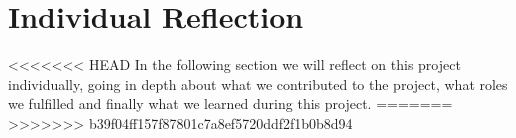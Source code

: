 \newpage
\section{Individual Reflection}
<<<<<<< HEAD
In the following section we will reflect on this project individually, going in depth about what we contributed to the project, what roles we fulfilled and finally what we learned during this project.
=======
>>>>>>> b39f04ff157f87801c7a8ef5720ddf2f1b0b8d94





